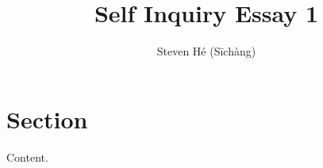 \documentclass{article}
\title{Self Inquiry Essay 1}
\author{Steven Hé (Sīchàng)}
\begin{document}
\maketitle
\section{Section}
Content.
\cite{gittins1993family}
\pagebreak

{}
\end{document}
